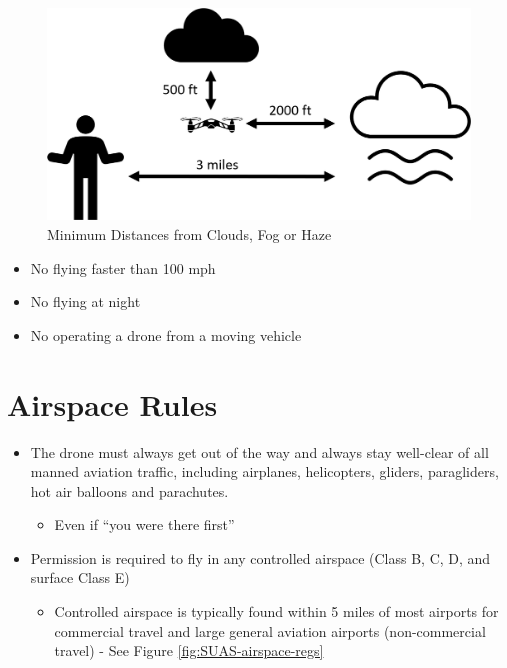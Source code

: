 \documentclass[
]{book}
\providecommand{\tightlist}{%
  \setlength{\itemsep}{0pt}\setlength{\parskip}{0pt}}
\begin{document}
\begin{figure}

{\centering \includegraphics[width=0.9\linewidth]{images/cloud_distance} 

}

\caption{Minimum Distances from Clouds, Fog or Haze}\label{fig:cloud-distance}
\end{figure}

\begin{itemize}
\tightlist
\item
  No flying faster than 100 mph
\item
  No flying at night
\item
  No operating a drone from a moving vehicle
\end{itemize}

\hypertarget{airspace-rules}{%
\section{Airspace Rules}\label{airspace-rules}}

\begin{itemize}
\tightlist
\item
  The drone must always get out of the way and always stay well-clear of all manned aviation traffic, including airplanes, helicopters, gliders, paragliders, hot air balloons and parachutes.

  \begin{itemize}
  \tightlist
  \item
    Even if ``you were there first''
  \end{itemize}
\item
  Permission is required to fly in any controlled airspace (Class B, C, D, and surface Class E)

  \begin{itemize}
  \tightlist
  \item
    Controlled airspace is typically found within 5 miles of most airports for commercial travel and large general aviation airports (non-commercial travel) - See Figure \ref{fig:SUAS-airspace-regs}
  \end{itemize}
\end{itemize}
\end{document}
